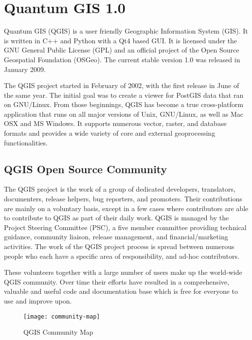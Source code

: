 \section{Quantum GIS 1.0}
\setcounter{page}{1}

Quantum GIS (QGIS) is a user friendly Geographic Information System (GIS).
It is written in C++ and Python with a Qt4 based GUI. It is licensed under the
GNU General Public License (GPL) and an official project of the Open Source
Geospatial Foundation (OSGeo). The current stable version 1.0 was released in
January 2009. 


The QGIS project started in February of 2002, with the first release in June
of the same year. The initial goal was to create a viewer for PostGIS data
that ran on GNU/Linux. From those beginnings, QGIS has become a true
cross-platform application that runs on all major versions of Unix,
GNU/Linux, as well as Mac OSX and MS Windows. It supports numerous vector,
raster, and database formats and provides a wide variety of core and external
geoprocessing functionalities.

\subsection{QGIS Open Source Community}

The QGIS project is the work of a group of dedicated developers,
translators, documenters, release helpers, bug reporters, and promoters. Their 
contributions are mainly on a voluntary basis, except in a few cases where 
contributors are able to contribute to QGIS as part of their daily work. QGIS 
is managed by the Project Steering Committee (PSC), a five member committee
providing technical guidance, community liaison, release management, and
financial/marketing activities. The work of the QGIS project process is
spread between numerous people who each have a specific area of
responsibility, and ad-hoc contributors.

These volunteers together with a large number of users make up the
world-wide QGIS community. Over time their efforts have resulted in a
comprehensive,
valuable and useful code and documentation base which is free for everyone 
to use and improve upon.

\begin{figure}[h]
   \begin{center}
   \caption{QGIS Community Map}\label{fig:community-map}\smallskip
   \texttt{[image: community-map]}
\end{center}
\end{figure}

